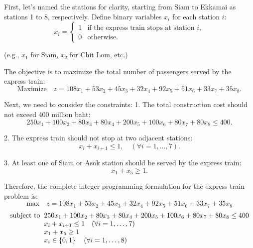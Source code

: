 \documentclass[a4paper, 10pt]{article}
\begin{document}
\begin{solution}
First, let's named the stations for clarity, starting from Siam to Ekkamai as stations 1 to 8, respectively.
Define binary variables \( x_i \) for each station \( i \):
\[ x_i =
\begin{cases}
1 & \text{if the express train stops at station } i, \\
0 & \text{otherwise}.
\end{cases} \]

(e.g., \( x_1 \) for Siam, \( x_2 \) for Chit Lom, etc.)

\vspace{3mm}

The objective is to maximize the total number of passengers served by the express train:
\[ \text{Maximize} \quad z = 108x_1 + 53x_2 + 45x_3 + 32x_4 + 92x_5 + 51x_6 + 33x_7 + 35x_8. \]

Next, we need to consider the constraints:
1. The total construction cost should not exceed 400 million baht:
\[ 250x_1 + 100x_2 + 80x_3 + 80x_4 + 200x_5 + 100x_6 + 80x_7 + 80x_8 \leq 400. \]

2. The express train should not stop at two adjacent stations:
\[ x_i + x_{i+1} \leq 1, \quad (\forall i = 1, \ldots, 7). \]

3. At least one of Siam or Asok station should be served by the express train:
\[ x_1 + x_5 \geq 1. \]

Therefore, the complete integer programming formulation for the express train problem is:
\[ \text{max} \quad z = 108x_1 + 53x_2 + 45x_3 + 32x_4 + 92x_5 + 51x_6 + 33x_7 + 35x_8 \]
\[
\begin{array}{@{\hspace{2mm}} r @{\hspace{2mm}} l}
    \text{subject to} & 250x_1 + 100x_2 + 80x_3 + 80x_4 + 200x_5 + 100x_6 + 80x_7 + 80x_8 \leq 400 \\
    & x_i + x_{i+1} \leq 1 \quad (\forall i = 1, \ldots, 7) \\
    & x_1 + x_5 \geq 1 \\
    & x_i \in \set{ 0, 1 } \quad (\forall i = 1, \ldots, 8) \\
\end{array}
\]
\end{solution}
\end{document}
